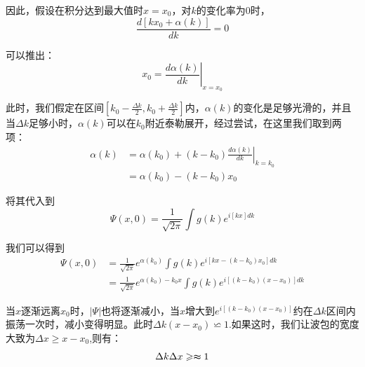 \documentclass{article}
\begin{document}
因此，假设在积分达到最大值时$x=x_0$，对$k$的变化率为$0$时，
\[
	\frac{d\left[kx_0+\alpha(k)\right]}{dk}=0
\]

可以推出：
\[
	x_0=\left.\frac{d\alpha(k)}{dk}\right|_{x=x_0}
\]

此时，我们假定在区间$\left[k_0-\frac{\Delta k}{2},k_0+\frac{\Delta k}{2}\right]$内，$\alpha(k)$的变化是足够光滑的，并且当$\Delta k$足够小时，$\alpha(k)$可以在$k_0$附近泰勒展开，经过尝试，在这里我们取到两项：
\begin{align}
	\alpha(k) & =\alpha(k_0)+\left(k-k_0\right)\left.\frac{d\alpha(k)}{dk}\right|_{k=k_0} \\
	          & =\alpha(k_0)-(k-k_0)x_0
\end{align}

将其代入到
\[\Psi(x,0)=\frac{1}{\sqrt{2\pi}}\int g(k)e^{i\left[kx\right]dk}\]

我们可以得到
\begin{align*}
	\Psi(x,0) & =\frac{1}{\sqrt{2\pi}}e^{\alpha(k_0)}\int g(k)e^{i\left[kx-(k-k_0)x_0\right]dk}       \\
	          & =\frac{1}{\sqrt{2\pi}}e^{\alpha(k_0)-k_0x}\int g(k)e^{i\left[(k-k_0)(x-x_0)\right]dk}
\end{align*}

当$x$逐渐远离$x_0$时，$|\Psi|$也将逐渐减小，当$x$增大到$e^{i\left[(k-k_0)(x-x_0)\right]}$约在$\Delta k$区间内振荡一次时，减小变得明显。此时$\Delta k(x-x_0)\backsimeq 1$.如果这时，我们让波包的宽度大致为$\Delta x\geqslant x-x_0$,则有：
\[
	\Delta k\Delta x\geqslant  \thickapprox 1
\]
\end{document}
